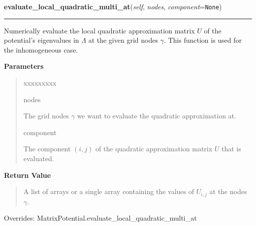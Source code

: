 \hspace{.8\funcindent}\begin{boxedminipage}{\funcwidth}

    \raggedright \textbf{evaluate\_local\_quadratic\_multi\_at}(\textit{self}, \textit{nodes}, \textit{component}={\tt None})

    \vspace{-1.5ex}

    \rule{\textwidth}{0.5\fboxrule}
\setlength{\parskip}{2ex}
    Numerically evaluate the local quadratic approximation matrix $U$ of
    the potential's eigenvalues in $\Lambda$ at the given
    grid nodes $\gamma$. This function is used for the
    inhomogeneous case.

\setlength{\parskip}{1ex}
      \textbf{Parameters}
      \vspace{-1ex}

      \begin{quote}
        \begin{Ventry}{xxxxxxxxx}

          \item[nodes]

          The grid nodes $\gamma$ we want to evaluate the
          quadratic approximation at.

          \item[component]

          The component $\left(i,j \right)$ of the quadratic
          approximation matrix $U$ that is evaluated.

        \end{Ventry}

      \end{quote}

      \textbf{Return Value}
    \vspace{-1ex}

      \begin{quote}
      A list of arrays or a single array containing the values of
      $U_{i,j}$ at the nodes $\gamma$.

      \end{quote}



      Overrides: MatrixPotential.evaluate\_local\_quadratic\_multi\_at

    \end{boxedminipage}

    \vspace{0.5ex}

